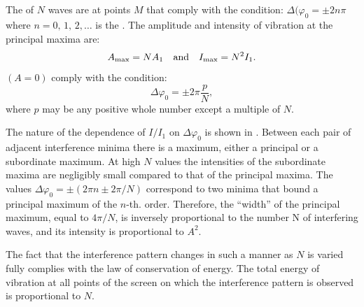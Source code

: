 \subsection{}\label{32.4.3} The  of $N$ waves  are at points $M$ that comply with the condition: $\Delta (\varphi_{0} = \pm 2n \pi$ where $n = 0, \,1,\, 2, \dots{}$ is the . The amplitude and intensity of vibration at the principal maxima are:
\begin{equation*}%
A_{\text{max}} =  NA_{1} \qand I_{\text{max}} = N^{2}I_{1}.
\end{equation*}
 $(A = 0)$ comply with the condition:
\begin{equation*}%
\Delta \varphi_{0} = \pm 2\pi \frac{p}{N}, 
\end{equation*}
where $p$ may be any positive whole number except a multiple of $N$.

The nature of the dependence of $I/I_{1}$ on $\Delta \varphi_{0}$  is shown in . Between each pair of adjacent interference minima there is a maximum, either a principal or a subordinate maximum. At high $N$ values the intensities of the subordinate maxima
are negligibly small compared to that of the principal maxima.
The values $\Delta \varphi_{0} = \pm (2\pi n \pm 2\pi/N)$ correspond to two minima that bound a principal maximum of the $n$-th. order. Therefore, the ``width'' of the principal maximum, equal to $4\pi/N$, is inversely proportional to the number N of interfering waves, and its intensity is proportional to $A^{2}$. 

The  fact that the interference pattern changes in such a manner as $N$ is varied fully complies with the law of conservation of energy. The total energy of vibration at all points of the screen on which the interference pattern is observed is proportional to $N$.

